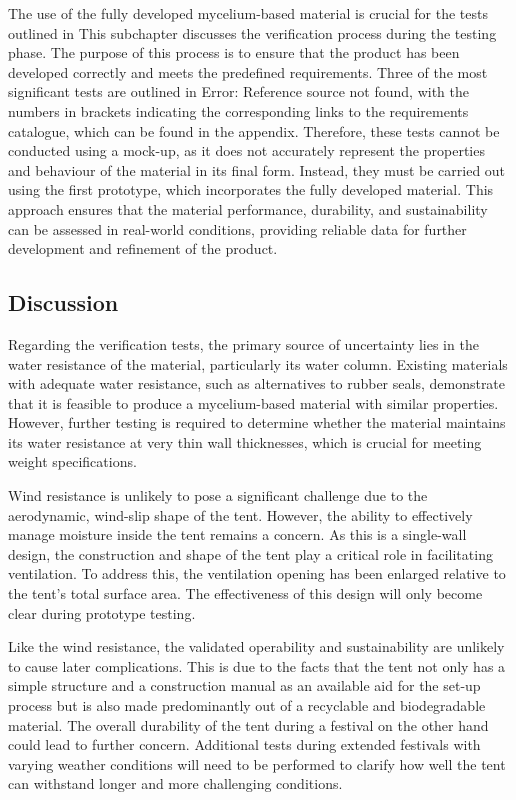 \documentclass{article}
\begin{document}
The use of the fully developed mycelium-based material is crucial for the tests outlined
in This subchapter discusses the verification process during the testing phase.
The purpose of this process is to ensure that the product has been developed correctly
and meets the predefined requirements. Three of the most significant tests are outlined
in Error: Reference source not found, with the numbers in brackets indicating the
corresponding links to the requirements catalogue, which can be found in the appendix.
Therefore, these tests cannot be conducted using a mock-up, as it does not accurately
represent the properties and behaviour of the material in its final form. Instead, they
must be carried out using the first prototype, which incorporates the fully developed
material. This approach ensures that the material performance, durability, and
sustainability can be assessed in real-world conditions, providing reliable data for
further development and refinement of the product.

\subsection{Discussion}
Regarding the verification tests, the primary source of uncertainty lies in the water
resistance of the material, particularly its water column. Existing materials with
adequate water resistance, such as alternatives to rubber seals, demonstrate that it is
feasible to produce a mycelium-based material with similar properties. However, further
testing is required to determine whether the material maintains its water resistance at
very thin wall thicknesses, which is crucial for meeting weight specifications.

Wind resistance is unlikely to pose a significant challenge due to the aerodynamic,
wind-slip shape of the tent. However, the ability to effectively manage moisture inside
the tent remains a concern. As this is a single-wall design, the construction and shape
of the tent play a critical role in facilitating ventilation. To address this, the
ventilation opening has been enlarged relative to the tent's total surface area. The
effectiveness of this design will only become clear during prototype testing.

Like the wind resistance, the validated operability and sustainability are unlikely to
cause later complications. This is due to the facts that the tent not only has a simple
structure and a construction manual as an available aid for the set-up process but is also
made predominantly out of a recyclable and biodegradable material. The overall durability
of the tent during a festival on the other hand could lead to further concern. Additional
tests during extended festivals with varying weather conditions will need to be performed
to clarify how well the tent can withstand longer and more challenging conditions.
\end{document}
